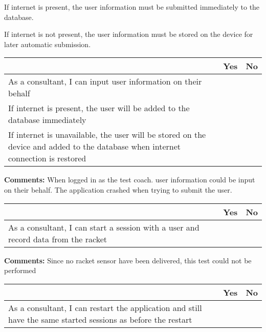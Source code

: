 If internet is present, the user information must be submitted immediately to the database.

If internet is not present, the user information must be stored on the device for later automatic submission.

\begin{tabularx}{\textwidth}{|b|c|c|}
	\hline
	 & Yes & No \\
	\hline
	As a consultant, I can input user information on their behalf & \xmark  &  \\
	\hline
	If internet is present, the user will be added to the database immediately &  & \xmark \\
	\hline
	If internet is unavailable, the user will be stored on the device and added to the database when internet connection is restored &  & \xmark  \\
	\hline
	\end{tabularx}
	
\vspace{3mm}
\textbf{Comments:}
When logged in as the test coach. user information could be input on their behalf.
The application crashed when trying to submit the user.
\vspace{3mm}


\begin{tabularx}{\textwidth}{|b|c|c|}
	\hline
	 & Yes & No \\
	\hline
	As a consultant, I can start a session with a user and record data from the racket &   & \xmark  \\
	\hline
	\end{tabularx}
	
\vspace{3mm}
\textbf{Comments:}
Since no racket sensor have been delivered, this test could not be performed
\vspace{3mm}


\begin{tabularx}{\textwidth}{|b|c|c|}
	\hline
	 & Yes & No \\
	\hline
	As a consultant, I can restart the application and still have the same started sessions as before the restart &   & \xmark  \\
	\hline
	\end{tabularx}

